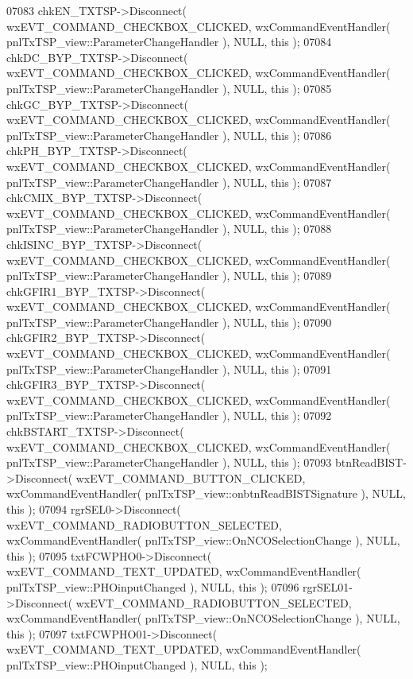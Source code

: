 \begin{DoxyCode}
07083     chkEN_TXTSP->Disconnect( wxEVT\_COMMAND\_CHECKBOX\_CLICKED, wxCommandEventHandler( 
      pnlTxTSP_view::ParameterChangeHandler ), NULL, \textcolor{keyword}{this} );
07084     chkDC_BYP_TXTSP->Disconnect( wxEVT\_COMMAND\_CHECKBOX\_CLICKED, wxCommandEventHandler( 
      pnlTxTSP_view::ParameterChangeHandler ), NULL, \textcolor{keyword}{this} );
07085     chkGC_BYP_TXTSP->Disconnect( wxEVT\_COMMAND\_CHECKBOX\_CLICKED, wxCommandEventHandler( 
      pnlTxTSP_view::ParameterChangeHandler ), NULL, \textcolor{keyword}{this} );
07086     chkPH_BYP_TXTSP->Disconnect( wxEVT\_COMMAND\_CHECKBOX\_CLICKED, wxCommandEventHandler( 
      pnlTxTSP_view::ParameterChangeHandler ), NULL, \textcolor{keyword}{this} );
07087     chkCMIX_BYP_TXTSP->Disconnect( wxEVT\_COMMAND\_CHECKBOX\_CLICKED, wxCommandEventHandler( 
      pnlTxTSP_view::ParameterChangeHandler ), NULL, \textcolor{keyword}{this} );
07088     chkISINC_BYP_TXTSP->Disconnect( wxEVT\_COMMAND\_CHECKBOX\_CLICKED, wxCommandEventHandler( 
      pnlTxTSP_view::ParameterChangeHandler ), NULL, \textcolor{keyword}{this} );
07089     chkGFIR1_BYP_TXTSP->Disconnect( wxEVT\_COMMAND\_CHECKBOX\_CLICKED, wxCommandEventHandler( 
      pnlTxTSP_view::ParameterChangeHandler ), NULL, \textcolor{keyword}{this} );
07090     chkGFIR2_BYP_TXTSP->Disconnect( wxEVT\_COMMAND\_CHECKBOX\_CLICKED, wxCommandEventHandler( 
      pnlTxTSP_view::ParameterChangeHandler ), NULL, \textcolor{keyword}{this} );
07091     chkGFIR3_BYP_TXTSP->Disconnect( wxEVT\_COMMAND\_CHECKBOX\_CLICKED, wxCommandEventHandler( 
      pnlTxTSP_view::ParameterChangeHandler ), NULL, \textcolor{keyword}{this} );
07092     chkBSTART_TXTSP->Disconnect( wxEVT\_COMMAND\_CHECKBOX\_CLICKED, wxCommandEventHandler( 
      pnlTxTSP_view::ParameterChangeHandler ), NULL, \textcolor{keyword}{this} );
07093     btnReadBIST->Disconnect( wxEVT\_COMMAND\_BUTTON\_CLICKED, wxCommandEventHandler( 
      pnlTxTSP_view::onbtnReadBISTSignature ), NULL, \textcolor{keyword}{this} );
07094     rgrSEL0->Disconnect( wxEVT\_COMMAND\_RADIOBUTTON\_SELECTED, wxCommandEventHandler( 
      pnlTxTSP_view::OnNCOSelectionChange ), NULL, \textcolor{keyword}{this} );
07095     txtFCWPHO0->Disconnect( wxEVT\_COMMAND\_TEXT\_UPDATED, wxCommandEventHandler( 
      pnlTxTSP_view::PHOinputChanged ), NULL, \textcolor{keyword}{this} );
07096     rgrSEL01->Disconnect( wxEVT\_COMMAND\_RADIOBUTTON\_SELECTED, wxCommandEventHandler( 
      pnlTxTSP_view::OnNCOSelectionChange ), NULL, \textcolor{keyword}{this} );
07097     txtFCWPHO01->Disconnect( wxEVT\_COMMAND\_TEXT\_UPDATED, wxCommandEventHandler( 
      pnlTxTSP_view::PHOinputChanged ), NULL, \textcolor{keyword}{this} );

\end{DoxyCode}
